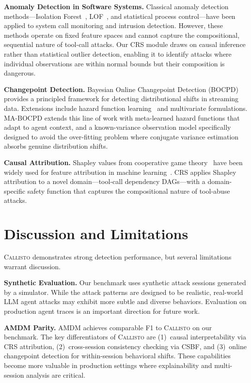 \documentclass[conference,compsoc]{IEEEtran}
\newcommand{\system}{\textsc{Callisto}}
\begin{document}
\textbf{Anomaly Detection in Software Systems.} Classical anomaly detection methods---Isolation Forest~\cite{liu2008isolation}, LOF~\cite{breunig2000lof}, and statistical process control---have been applied to system call monitoring and intrusion detection. However, these methods operate on fixed feature spaces and cannot capture the compositional, sequential nature of tool-call attacks. Our CRS module draws on causal inference rather than statistical outlier detection, enabling it to identify attacks where individual observations are within normal bounds but their composition is dangerous.

\textbf{Changepoint Detection.} Bayesian Online Changepoint Detection (BOCPD)~\cite{adams2007bocpd} provides a principled framework for detecting distributional shifts in streaming data. Extensions include hazard function learning~\cite{wilson2010bocpd} and multivariate formulations. MA-BOCPD extends this line of work with meta-learned hazard functions that adapt to agent context, and a known-variance observation model specifically designed to avoid the over-fitting problem where conjugate variance estimation absorbs genuine distribution shifts.

\textbf{Causal Attribution.} Shapley values from cooperative game theory~\cite{shapley1953value} have been widely used for feature attribution in machine learning~\cite{lundberg2017shap}. CRS applies Shapley attribution to a novel domain---tool-call dependency DAGs---with a domain-specific safety function that captures the compositional nature of tool-abuse attacks.

\section{Discussion and Limitations}
\label{sec:discussion}

\system{} demonstrates strong detection performance, but several limitations warrant discussion.

\textbf{Synthetic Evaluation.} Our benchmark uses synthetic attack sessions generated by a simulator. While the attack patterns are designed to be realistic, real-world LLM agent attacks may exhibit more subtle and diverse behaviors. Evaluation on production agent traces is an important direction for future work.

\textbf{AMDM Parity.} AMDM achieves comparable F1 to \system{} on our benchmark. The key differentiators of \system{} are (1)~causal interpretability via CRS attribution, (2)~cross-session consistency checking via CSBF, and (3)~online changepoint detection for within-session behavioral shifts. These capabilities become more valuable in production settings where explainability and multi-session analysis are critical.
\end{document}
